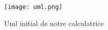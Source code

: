 \begin{figure}[h]
    \centering
    \texttt{[image: uml.png]}
    \caption{Uml initial de notre calculatrice}
    \label{fig:my_label}
\end{figure}
